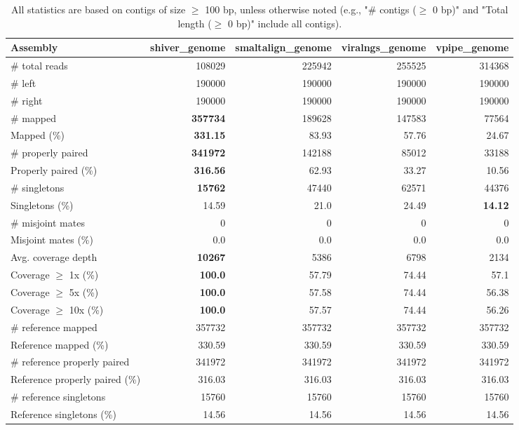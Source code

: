 \documentclass[12pt,a4paper]{article}
\begin{document}
\begin{table}[ht]
\begin{center}
\caption{All statistics are based on contigs of size $\geq$ 100 bp, unless otherwise noted (e.g., "\# contigs ($\geq$ 0 bp)" and "Total length ($\geq$ 0 bp)" include all contigs).}
\begin{tabular}{|l*{4}{|r}|}
\hline
Assembly & shiver\_genome & smaltalign\_genome & viralngs\_genome & vpipe\_genome \\ \hline
\# total reads & 108029 & 225942 & 255525 & 314368 \\ \hline
\# left & 190000 & 190000 & 190000 & 190000 \\ \hline
\# right & 190000 & 190000 & 190000 & 190000 \\ \hline
\# mapped & {\bf 357734} & 189628 & 147583 & 77564 \\ \hline
Mapped (\%) & {\bf 331.15} & 83.93 & 57.76 & 24.67 \\ \hline
\# properly paired & {\bf 341972} & 142188 & 85012 & 33188 \\ \hline
Properly paired (\%) & {\bf 316.56} & 62.93 & 33.27 & 10.56 \\ \hline
\# singletons & {\bf 15762} & 47440 & 62571 & 44376 \\ \hline
Singletons (\%) & 14.59 & 21.0 & 24.49 & {\bf 14.12} \\ \hline
\# misjoint mates & 0 & 0 & 0 & 0 \\ \hline
Misjoint mates (\%) & 0.0 & 0.0 & 0.0 & 0.0 \\ \hline
Avg. coverage depth & {\bf 10267} & 5386 & 6798 & 2134 \\ \hline
Coverage $\geq$ 1x (\%) & {\bf 100.0} & 57.79 & 74.44 & 57.1 \\ \hline
Coverage $\geq$ 5x (\%) & {\bf 100.0} & 57.58 & 74.44 & 56.38 \\ \hline
Coverage $\geq$ 10x (\%) & {\bf 100.0} & 57.57 & 74.44 & 56.26 \\ \hline
\# reference mapped & 357732 & 357732 & 357732 & 357732 \\ \hline
Reference mapped (\%) & 330.59 & 330.59 & 330.59 & 330.59 \\ \hline
\# reference properly paired & 341972 & 341972 & 341972 & 341972 \\ \hline
Reference properly paired (\%) & 316.03 & 316.03 & 316.03 & 316.03 \\ \hline
\# reference singletons & 15760 & 15760 & 15760 & 15760 \\ \hline
Reference singletons (\%) & 14.56 & 14.56 & 14.56 & 14.56 \\ \hline

\end{tabular}
\end{center}
\end{table}
\end{document}

